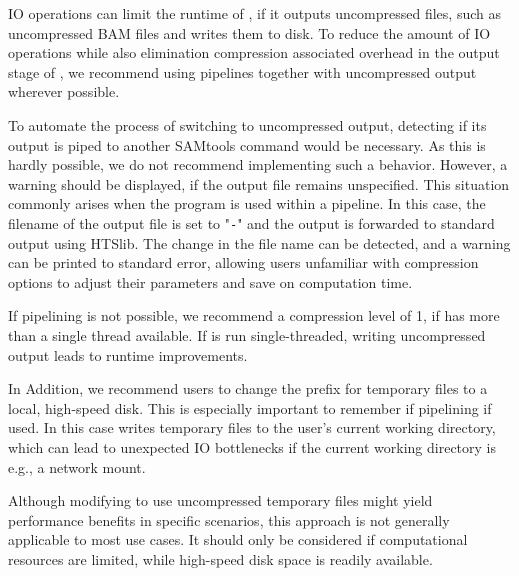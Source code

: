 IO operations can limit the runtime of \sort, if it outputs uncompressed files, such as uncompressed BAM files and writes them to disk.
To reduce the amount of IO operations while also elimination compression associated overhead in the output stage of \sort, we recommend using pipelines together with uncompressed output wherever possible.

To automate the process of \sort switching to uncompressed output, detecting if its output is piped to another SAMtools command would be necessary. As this is hardly possible, we do not recommend implementing such a behavior. However, a warning should be displayed, if the output file remains unspecified. This situation commonly arises when the program is used within a pipeline. In this case, the filename of the output file is set to "\texttt{-}" and the output is forwarded to standard output using HTSlib. The change in the file name can be detected, and a warning can be printed to standard error, allowing users unfamiliar with compression options to adjust their parameters and save on computation time.

If pipelining is not possible, we recommend a compression level of 1, if \sort has more than a single thread available. If \sort is run single-threaded, writing uncompressed output leads to runtime improvements.

In Addition, we recommend users to change the prefix for temporary files to a local, high-speed disk. This is especially important to remember if pipelining if used. In this case \sort writes temporary files to the user's current working directory, which can lead to unexpected IO bottlenecks if the current working directory is e.g., a network mount.

Although modifying \sort to use uncompressed temporary files might yield performance benefits in specific scenarios, this approach is not generally applicable to most use cases. It should only be considered if computational resources are limited, while high-speed disk space is readily available.
